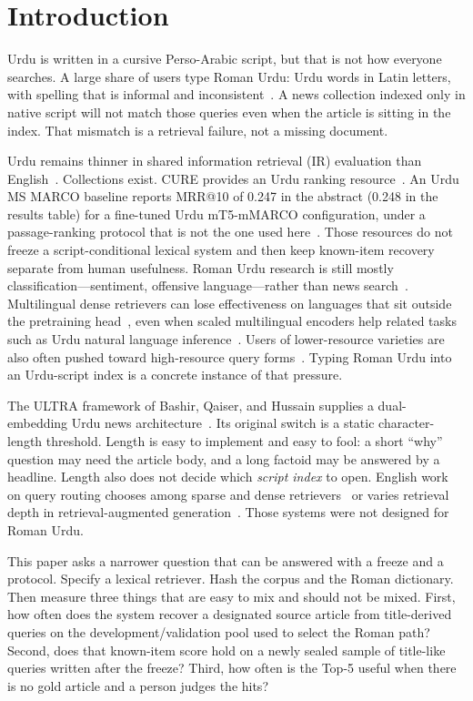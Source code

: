 \documentclass[10pt,letterpaper]{article}
\begin{document}
\clearpage
{}
\linenumbers

\section*{Introduction}
Urdu is written in a cursive Perso-Arabic script, but that is not how everyone searches. A large share of users type Roman Urdu: Urdu words in Latin letters, with spelling that is informal and inconsistent~\cite{bib1,bib2,bib3}. A news collection indexed only in native script will not match those queries even when the article is sitting in the index. That mismatch is a retrieval failure, not a missing document.

Urdu remains thinner in shared information retrieval (IR) evaluation than English~\cite{bib4}. Collections exist. CURE provides an Urdu ranking resource~\cite{bib5}. An Urdu MS MARCO baseline reports MRR@10 of 0.247 in the abstract (0.248 in the results table) for a fine-tuned Urdu mT5-mMARCO configuration, under a passage-ranking protocol that is not the one used here~\cite{bib6}. Those resources do not freeze a script-conditional lexical system and then keep known-item recovery separate from human usefulness. Roman Urdu research is still mostly classification---sentiment, offensive language---rather than news search~\cite{bib1,bib2}. Multilingual dense retrievers can lose effectiveness on languages that sit outside the pretraining head~\cite{bib7}, even when scaled multilingual encoders help related tasks such as Urdu natural language inference~\cite{bib8}. Users of lower-resource varieties are also often pushed toward high-resource query forms~\cite{bib9}. Typing Roman Urdu into an Urdu-script index is a concrete instance of that pressure.

The ULTRA framework of Bashir, Qaiser, and Hussain supplies a dual-embedding Urdu news architecture~\cite{bib10}. Its original switch is a static character-length threshold. Length is easy to implement and easy to fool: a short ``why'' question may need the article body, and a long factoid may be answered by a headline. Length also does not decide which \emph{script index} to open. English work on query routing chooses among sparse and dense retrievers~\cite{bib11} or varies retrieval depth in retrieval-augmented generation~\cite{bib12}. Those systems were not designed for Roman Urdu.

This paper asks a narrower question that can be answered with a freeze and a protocol. Specify a lexical retriever. Hash the corpus and the Roman dictionary. Then measure three things that are easy to mix and should not be mixed. First, how often does the system recover a designated source article from title-derived queries on the development/validation pool used to select the Roman path? Second, does that known-item score hold on a newly sealed sample of title-like queries written after the freeze? Third, how often is the Top-5 useful when there is no gold article and a person judges the hits?
\end{document}
